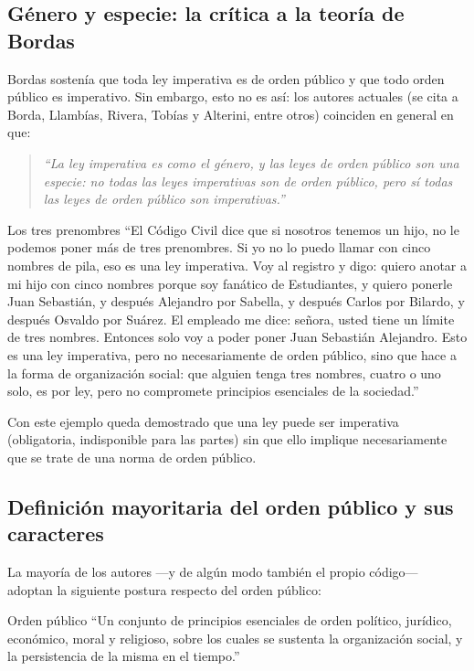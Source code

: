 \documentclass[12pt,oneside]{book}
\begin{document}
\subsection{Género y especie: la crítica a la teoría de Bordas}

Bordas sostenía que toda ley imperativa es de orden público y que todo orden público es imperativo. Sin embargo, esto no es así: los autores actuales (se cita a Borda, Llambías, Rivera, Tobías y Alterini, entre otros) coinciden en general en que:

\begin{quote}
\itshape
``La ley imperativa es como el género, y las leyes de orden público son una especie: no todas las leyes imperativas son de orden público, pero sí todas las leyes de orden público son imperativas.''
\end{quote}

\begin{example}{Los tres prenombres}
``El Código Civil dice que si nosotros tenemos un hijo, no le podemos poner más de tres prenombres. Si yo no lo puedo llamar con cinco nombres de pila, eso es una ley imperativa. Voy al registro y digo: quiero anotar a mi hijo con cinco nombres porque soy fanático de Estudiantes, y quiero ponerle Juan Sebastián, y después Alejandro por Sabella, y después Carlos por Bilardo, y después Osvaldo por Suárez. El empleado me dice: señora, usted tiene un límite de tres nombres. Entonces solo voy a poder poner Juan Sebastián Alejandro. Esto es una ley imperativa, pero no necesariamente de orden público, sino que hace a la forma de organización social: que alguien tenga tres nombres, cuatro o uno solo, es por ley, pero no compromete principios esenciales de la sociedad.''
\end{example}

Con este ejemplo queda demostrado que una ley puede ser imperativa (obligatoria, indisponible para las partes) sin que ello implique necesariamente que se trate de una norma de orden público.

\subsection{Definición mayoritaria del orden público y sus caracteres}

La mayoría de los autores —y de algún modo también el propio código— adoptan la siguiente postura respecto del orden público:

\begin{definition}{Orden público}
``Un conjunto de principios esenciales de orden político, jurídico, económico, moral y religioso, sobre los cuales se sustenta la organización social, y la persistencia de la misma en el tiempo.''
\end{definition}
\end{document}
